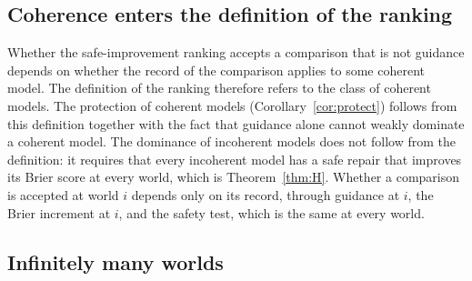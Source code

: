 \documentclass[11pt]{article}
\theoremstyle{plain}
\theoremstyle{definition}
\theoremstyle{remark}
\begin{document}
\subsection{Coherence enters the definition of the ranking}

Whether the safe-improvement ranking accepts a comparison that is not guidance depends on
whether the record of the comparison applies to some coherent model. The definition of the
ranking therefore refers to the class of coherent models. The protection of coherent
models (Corollary~\ref{cor:protect}) follows from this definition together with the fact
that guidance alone cannot weakly dominate a coherent model. The dominance of incoherent
models does not follow from the definition: it requires that every incoherent model has a
safe repair that improves its Brier score at every world, which is
Theorem~\ref{thm:H}. Whether a comparison is accepted at world $i$ depends only on its
record, through guidance at $i$, the Brier increment at $i$, and the safety test, which is
the same at every world.

\subsection{Infinitely many worlds}
\end{document}
